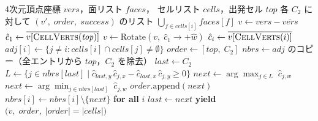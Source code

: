 \documentclass[12pt,a4paper]{article}
\theoremstyle{definition}
\begin{document}
\begin{algorithm}[h]
\caption{peeling4Df（4次元版，グリーディ）}
\label{alg:4d}
\begin{algorithmic}[1]
\Require 4次元頂点座標 $\mathit{vers}$，面リスト $\mathit{faces}$，
         セルリスト $\mathit{cells}$，出発セル $\mathit{top}$
\Ensure  各 $C_2$ に対して
         $(v',\; \mathit{order},\; \mathit{success})$ のリスト
  \Return $\bigcup_{f \in \mathit{cells}[i]} \mathit{faces}[f]$
\EndFunction
\Statex
\State $v \gets \mathit{vers} - \overline{\mathit{vers}}$
\State $\hat{c}_1 \gets \overline{v[\textsc{CellVerts}(\mathit{top})]}$
\State $v \gets \mathrm{Rotate}(v,\; \hat{c}_1 \to +\hat{w})$
  \State $\hat{c}_i \gets \overline{v[\textsc{CellVerts}(i)]}$
\EndFor
{}
  \State $\mathit{adj}[i] \gets
    \{j \neq i : \mathit{cells}[i] \cap \mathit{cells}[j] \neq \emptyset\}$
\EndFor
\Statex
{}
  \State $\mathit{order} \gets [\mathit{top},\; C_2]$
  \State $\mathit{nbrs} \gets \mathit{adj}$ のコピー（全エントリから $\mathit{top}$，$C_2$ を除去）
  \State $\mathit{last} \gets C_2$
    \State $L \gets \bigl\{j \in \mathit{nbrs}[\mathit{last}] \mid
             \hat{c}_{\mathit{last},y}\,\hat{c}_{j,x}
             - \hat{c}_{\mathit{last},x}\,\hat{c}_{j,y} \geq 0\bigr\}$
      \State $\mathit{next} \gets \arg\max_{j \in L}\; \hat{c}_{j,w}$
    \Else
      \State $\mathit{next} \gets \arg\min_{j \in \mathit{nbrs}[\mathit{last}]}\; \hat{c}_{j,w}$
    \EndIf
    \State $\mathit{order}.\mathrm{append}(\mathit{next})$
    \State $\mathit{nbrs}[i] \gets \mathit{nbrs}[i] \setminus \{\mathit{next}\}$
      \hspace{2em}\textbf{for all} $i$
    \State $\mathit{last} \gets \mathit{next}$
  \EndWhile
  \State \textbf{yield} $\bigl(v,\; \mathit{order},\; |\mathit{order}| = |\mathit{cells}|\bigr)$
\EndFor
\end{algorithmic}
\end{algorithm}
\end{document}
